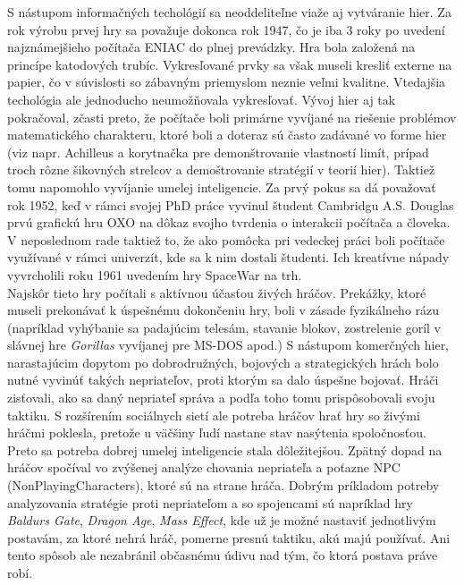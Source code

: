 \indent S nástupom informačných techológií sa neoddeliteľne viaže aj vytváranie hier. Za rok výrobu prvej hry sa považuje dokonca rok 1947, čo je iba 3 roky po uvedení najznámejšieho počítača ENIAC do plnej prevádzky\cite{historia}. Hra bola založená na princípe katodových trubíc. Vykresľované prvky sa  však museli kresliť externe na papier, čo v súvislosti so zábavným priemyslom neznie veľmi kvalitne. Vtedajšia techológia ale jednoducho neumožňovala vykresľovať. Vývoj hier aj tak pokračoval, zčasti preto, že počítače boli primárne vyvíjané na riešenie problémov matematického charakteru, ktoré boli a doteraz sú často zadávané vo forme hier (viz napr. Achilleus a korytnačka pre demonštrovanie vlastností limít, prípad troch rôzne šikovných strelcov a demoštrovanie stratégií v teorií hier). Taktiež tomu napomohlo vyvíjanie umelej inteligencie. Za prvý pokus sa dá považovať rok 1952, keď v rámci svojej PhD práce vyvinul študent Cambridgu A.S. Douglas prvú grafickú hru OXO na dôkaz svojho tvrdenia o interakcii počítača a človeka. V neposlednom rade taktiež to, že ako pomôcka pri vedeckej práci boli počítače využívané v rámci univerzít, kde sa k nim dostali študenti. Ich kreatívne nápady vyvrcholili roku 1961 uvedením hry SpaceWar na trh. \\
\indent Najskôr tieto hry počítali s aktívnou účasťou živých hráčov. Prekážky, ktoré museli prekonávať k úspešnému dokončeniu hry, boli v zásade fyzikálneho rázu (napríklad vyhýbanie sa padajúcim telesám, stavanie blokov, zostrelenie goríl v slávnej hre \emph{Gorillas} vyvíjanej pre MS-DOS apod.) S nástupom komerčných hier, narastajúcim dopytom po dobrodružných, bojových a strategických hrách bolo nutné vyvinúť takých nepriateľov, proti ktorým sa dalo úspešne bojovať. Hráči zisťovali, ako sa daný nepriateľ správa a podľa toho tomu prispôsobovali svoju taktiku. S rozšírením sociálnych sietí ale potreba hráčov hrať hry so živými hráčmi poklesla, pretože u väčšiny ľudí nastane stav nasýtenia spoločnosťou. Preto sa potreba dobrej umelej inteligencie stala dôležitejšou. Zpätný dopad na hráčov spočíval vo zvýšenej analýze chovania nepriateľa a poťazne NPC (NonPlayingCharacters), ktoré sú na strane hráča. Dobrým príkladom potreby analyzovania stratégie proti nepriateľom a so spojencami sú napríklad hry \emph{Baldurs Gate\cite{bioware}}, \emph{Dragon Age\cite{bioware}}, \emph{Mass Effect\cite{bioware}}, kde už je možné nastaviť jednotlivým postavám, za ktoré nehrá hráč, pomerne presnú taktiku, akú majú používať. Ani tento spôsob ale nezabránil občasnému údivu nad tým, čo ktorá postava práve robí. \\

